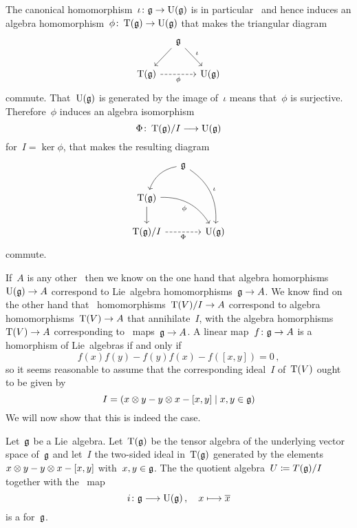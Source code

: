 \begin{remark}
  The canonical homomorphism~$\iota \colon \glie \to \Univ(\glie)$ is in particular~{\linear{$\kf$}} and hence induces an algebra homomorphism~$\phi \colon \Tensor(\glie) \to \Univ(\glie)$ that makes the triangular diagram
  \[
    \begin{tikzcd}[column sep = small]
      {}
      &
      \glie
      \arrow{dl}
      \arrow{dr}[above right]{\iota}
      &
      {}
      \\
      \Tensor(\glie)
      \arrow[dashed]{rr}[below]{\phi}
      &
      {}
      &
      \Univ(\glie)
    \end{tikzcd}
  \]
  commute.
  That~$\operatorname{U}(\mathfrak{g})$ is generated by the image of~$\iota$ means that~$\phi$ is surjective.
  Therefore~$\phi$ induces an algebra isomorphism
  \[
    \Phi
    \colon
    \Tensor(\glie)/I
    \to
    \Univ(\glie)
  \]
  for~$I = \ker \phi$, that makes the resulting diagram
   \[
    \begin{tikzcd}[column sep = small]
      {}
      &
      \glie
      \arrow[bend right]{dl}
      \arrow[bend left]{ddr}[above right]{\iota}
      &
      {}
      \\
      \Tensor(\glie)
      \arrow[bend left]{drr}[below left]{\phi}
      \arrow{d}
      &
      {}
      &
      {}
      \\
      \Tensor(\glie)/I
      \arrow[dashed]{rr}[below]{\Phi}
      &
      {}
      &
      \Univ(\glie)
    \end{tikzcd}
  \]
  commute.
  
  If~$A$ is any other~{\algebra{$\kf$}} then we know on the one hand that algebra homorphisms~$\Univ(\glie) \to A$ correspond to Lie~algebra homomorphisms~$\glie \to A$.
  We know find on the other hand that~{\algebra{$\kf$}} homomorphisms~$\Tensor(V)/I \to A$ correspond to algebra homomorphisms~$\Tensor(V) \to A$ that annihilate~$I$, with the algebra homorphisms~$\Tensor(V) \to A$ corresponding to~{\linear{$\kf$}} maps~$\glie \to A$.
  A linear map~$f \colon \glie \to A$ is a homorphism of Lie~algebras if and only if
  \[
      f(x) f(y)
    - f(y) f(x)
    - f([x,y])
    =
    0 \,,
  \]
  so it seems reasonable to assume that the corresponding ideal~$I$ of~$\operatorname{T}(V)$ ought to be given by
  \[
    I
    =
    (x \tensor y - y \tensor x - [x,y] \suchthat x, y \in \glie)
  \]
  We will now show that this is indeed the case.
\end{remark}


\begin{proposition}
  Let~$\mathfrak{g}$ be a Lie~algebra.
  Let~$\operatorname{T}(\mathfrak{g})$ be the tensor algebra of the underlying vector space of~$\mathfrak{g}$ and let~$I$ the two-sided ideal in~$\operatorname{T}(\mathfrak{g})$ generated by the elements $x \otimes y - y \otimes x - [x,y]$ with~$x,y \in \mathfrak{g}$.
  The the quotient algebra~$U \coloneqq T(\mathfrak{g})/I$ together with the~{\linear{$\kf$}} map
  \[
    i
    \colon
    \glie
    \to
    \Univ(\glie) \,,
    \quad
    x
    \mapsto
    \class{x}
  \]
  is a {\ua} for~$\mathfrak{g}$.
\end{proposition}


